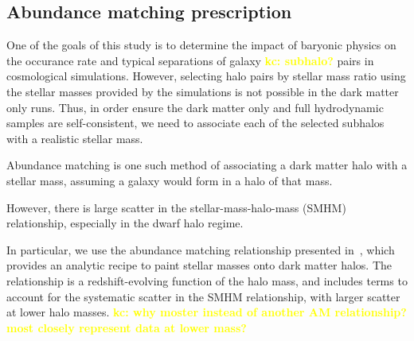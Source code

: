 \documentclass[twocolumn]{aastex631}
\newcommand{\kc}[1]{\textcolor{yellow}{\textbf{kc: #1}} }
\begin{document}



\subsection{Abundance matching prescription}\label{sec:methods-am}
One of the goals of this study is to determine the impact of baryonic physics on the occurance rate and typical separations of galaxy \kc{subhalo?} pairs in cosmological simulations. 
However, selecting halo pairs by stellar mass ratio using the stellar masses provided by the simulations is not possible in the dark matter only runs. 
Thus, in order ensure the dark matter only and full hydrodynamic samples are self-consistent, we need to associate each of the selected subhalos with a realistic stellar mass.

Abundance matching is one such method of associating a dark matter halo with a stellar mass, assuming a galaxy would form in a halo of that mass. 

However, there is large scatter in the stellar-mass-halo-mass (SMHM) relationship, especially in the dwarf halo regime. 



In particular, we use the abundance matching relationship presented in~\citet{Moster2013}, which provides an analytic recipe to paint stellar masses onto dark matter halos. 
The~\citet{Moster2013} relationship is a redshift-evolving function of the halo mass, and includes terms to account for the systematic scatter in the SMHM relationship, with larger scatter at lower halo masses.
\kc{why moster instead of another AM relationship? most closely represent data at lower mass? }
\end{document}
